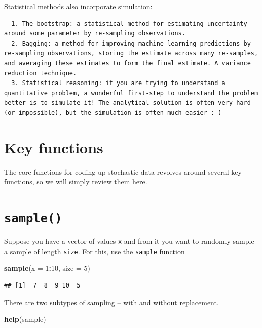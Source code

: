 \documentclass[]{book}
\newenvironment{Shaded}{\begin{snugshade}}{\end{snugshade}}
\newcommand{\KeywordTok}[1]{\textcolor[rgb]{0.13,0.29,0.53}{\textbf{#1}}}
\newcommand{\DataTypeTok}[1]{\textcolor[rgb]{0.13,0.29,0.53}{#1}}
\newcommand{\DecValTok}[1]{\textcolor[rgb]{0.00,0.00,0.81}{#1}}
\newcommand{\OperatorTok}[1]{\textcolor[rgb]{0.81,0.36,0.00}{\textbf{#1}}}
\newcommand{\NormalTok}[1]{#1}
\theoremstyle{definition}
\theoremstyle{definition}
\theoremstyle{definition}
\theoremstyle{remark}
\begin{document}
Statistical methods also incorporate simulation:

\begin{verbatim}
  1. The bootstrap: a statistical method for estimating uncertainty around some parameter by re-sampling observations. 
  2. Bagging: a method for improving machine learning predictions by re-sampling observations, storing the estimate across many re-samples, and averaging these estimates to form the final estimate. A variance reduction technique. 
  3. Statistical reasoning: if you are trying to understand a quantitative problem, a wonderful first-step to understand the problem better is to simulate it! The analytical solution is often very hard (or impossible), but the simulation is often much easier :-) 
\end{verbatim}

\section{Key functions}\label{key-functions}

The core functions for coding up stochastic data revolves around several
key functions, so we will simply review them here.

\section{\texorpdfstring{\texttt{sample()}}{sample()}}\label{sample}

Suppose you have a vector of values \texttt{x} and from it you want to
randomly sample a sample of length \texttt{size}. For this, use the
\texttt{sample} function

\begin{Shaded}
\begin{Highlighting}[]
\KeywordTok{sample}\NormalTok{(}\DataTypeTok{x =} \DecValTok{1}\OperatorTok{:}\DecValTok{10}\NormalTok{, }\DataTypeTok{size =} \DecValTok{5}\NormalTok{)}
\end{Highlighting}
\end{Shaded}

\begin{verbatim}
## [1]  7  8  9 10  5
\end{verbatim}

There are two subtypes of sampling -- with and without replacement.

\begin{Shaded}
\begin{Highlighting}[]
\KeywordTok{help}\NormalTok{(sample)}
\end{Highlighting}
\end{Shaded}
\end{document}
